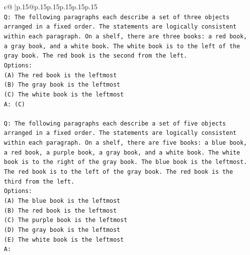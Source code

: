 \documentclass{article}
\begin{document}
{\begin{supertabular}{c@{$\;$}|p{.15\linewidth}@{}p{.15\linewidth}p{.15\linewidth}p{.15\linewidth}p{.15\linewidth}p{.15\linewidth}}
{{{\\ 
\texttt{Q: The following paragraphs each describe a set of three objects arranged in a fixed order. The statements are logically consistent within each paragraph. On a shelf, there are three books: a red book, a gray book, and a white book. The white book is to the left of the gray book. The red book is the second from the left.} \\
\texttt{Options:} \\
\texttt{(A) The red book is the leftmost} \\
\texttt{(B) The gray book is the leftmost} \\
\texttt{(C) The white book is the leftmost} \\
\texttt{A: (C)} \\
\\ 
\texttt{Q: The following paragraphs each describe a set of five objects arranged in a fixed order. The statements are logically consistent within each paragraph. On a shelf, there are five books: a blue book, a red book, a purple book, a gray book, and a white book. The white book is to the right of the gray book. The blue book is the leftmost. The red book is to the left of the gray book. The red book is the third from the left.} \\
\texttt{Options:} \\
\texttt{(A) The blue book is the leftmost} \\
\texttt{(B) The red book is the leftmost} \\
\texttt{(C) The purple book is the leftmost} \\
\texttt{(D) The gray book is the leftmost} \\
\texttt{(E) The white book is the leftmost} \\
\texttt{A:} \\
            }
        }
    }
     \\ \\


\end{supertabular}}
\end{document}
